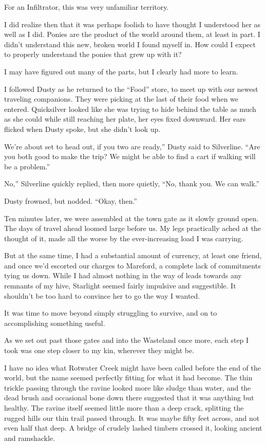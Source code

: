 For an Infiltrator, this was very unfamiliar territory.

I did realize then that it was perhaps foolish to have thought I understood her as well as I did. Ponies are the product of the world around them, at least in part. I didn’t understand this new, broken world I found myself in. How could I expect to properly understand the ponies that grew up with it?

I may have figured out many of the parts, but I clearly had more to learn.

I followed Dusty as he returned to the “Food” store, to meet up with our newest traveling companions. They were picking at the last of their food when we entered. Quicksilver looked like she was trying to hide behind the table as much as she could while still reaching her plate, her eyes fixed downward. Her ears flicked when Dusty spoke, but she didn’t look up.

\leavevmode{}We’re about set to head out, if you two are ready,” Dusty said to Silverline. “Are you both good to make the trip? We might be able to find a cart if walking will be a problem.”

\leavevmode{}No,” Silverline quickly replied, then more quietly, “No, thank you. We can walk.”

Dusty frowned, but nodded. “Okay, then.”

Ten minutes later, we were assembled at the town gate as it slowly ground open. The days of travel ahead loomed large before us. My legs practically ached at the thought of it, made all the worse by the ever-increasing load I was carrying.

But at the same time, I had a substantial amount of currency, at least one friend, and once we’d escorted our charges to Mareford, a complete lack of commitments tying us down. While I had almost nothing in the way of leads towards any remnants of my hive, Starlight seemed fairly impulsive and suggestible. It shouldn’t be too hard to convince her to go the way I wanted.

It was time to move beyond simply struggling to survive, and on to accomplishing something useful.

As we set out past those gates and into the Wasteland once more, each step I took was one step closer to my kin, wherever they might be.

{\br}%
I have no idea what Rotwater Creek might have been called before the end of the world, but the name seemed perfectly fitting for what it had become. The thin trickle passing through the ravine looked more like sludge than water, and the dead brush and occasional bone down there suggested that it was anything but healthy. The ravine itself seemed little more than a deep crack, splitting the rugged hills our thin trail passed through. It was maybe fifty feet across, and not even half that deep. A bridge of crudely lashed timbers crossed it, looking ancient and ramshackle.

